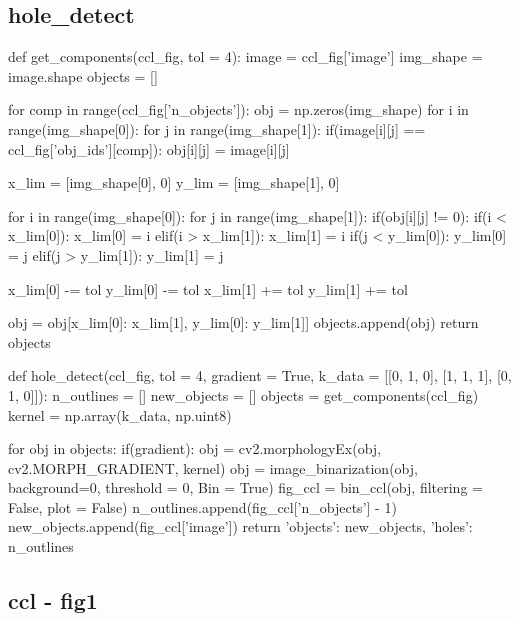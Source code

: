 \documentclass{article}
\begin{document}
\subsection{hole\_detect}
\label{cod:hole_detect}
\begin{python}
def get_components(ccl_fig, tol = 4):
	image = ccl_fig['image']
	img_shape = image.shape 
	objects = []
	
	for comp in range(ccl_fig['n_objects']):
		obj =  np.zeros(img_shape)
		for i in range(img_shape[0]):
			for j in range(img_shape[1]):
				if(image[i][j] == ccl_fig['obj_ids'][comp]):
					obj[i][j] = image[i][j]
			
		x_lim = [img_shape[0], 0]
		y_lim = [img_shape[1], 0]
		
		for i in range(img_shape[0]):
			for j in range(img_shape[1]):
				if(obj[i][j] != 0):
					if(i < x_lim[0]):
						x_lim[0] = i
					elif(i > x_lim[1]):
						x_lim[1] = i
					if(j < y_lim[0]):
						y_lim[0] = j
					elif(j > y_lim[1]):
						y_lim[1] = j
						
		x_lim[0] -= tol
		y_lim[0] -= tol
		x_lim[1] += tol
		y_lim[1] += tol
		
		obj = obj[x_lim[0]: x_lim[1], y_lim[0]: y_lim[1]]
		objects.append(obj)
	return objects


def hole_detect(ccl_fig, tol = 4, gradient = True, k_data = [[0, 1, 0], [1, 1, 1], [0, 1, 0]]):
	n_outlines = []
	new_objects = []
	objects = get_components(ccl_fig)
	kernel = np.array(k_data, np.uint8)
	
	for obj in objects:
		if(gradient):
			obj = cv2.morphologyEx(obj, cv2.MORPH_GRADIENT, kernel)
		obj = image_binarization(obj, background=0, threshold = 0, Bin = True)
		fig_ccl = bin_ccl(obj, filtering = False, plot = False)
		n_outlines.append(fig_ccl['n_objects'] - 1)
		new_objects.append(fig_ccl['image'])
	return {'objects': new_objects, 'holes': n_outlines}

\end{python}

\newpage
\subsection{ccl - fig1}
\label{cod:ccl_fig1}
\end{document}
